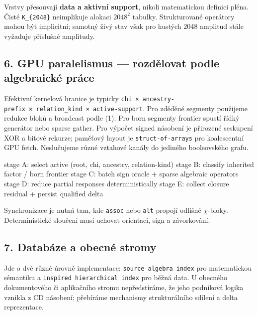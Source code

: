 \documentclass[
  10pt,
]{article}
\newenvironment{Shaded}{}{}
\newcommand{\NormalTok}[1]{#1}
\begin{document}
Vrstvy přesouvají \textbf{data a aktivní support}, nikoli matematickou
definici pléna. Čisté \texttt{K\_\{2048\}} neimplikuje alokaci
\(2048^2\) tabulky. Strukturované operátory mohou být implicitní;
samotný živý stav však pro hustých 2048 amplitud stále vyžaduje
příslušné amplitudy.

\subsection{6. GPU paralelismus --- rozdělovat podle algebraické
práce}\label{gpu-paralelismus-rozdux11blovat-podle-algebraickuxe9-pruxe1ce}

Efektivní kernelová hranice je typicky
\texttt{chi\ ×\ ancestry-prefix\ ×\ relation\_kind\ ×\ active-support}.
Pro zděděné segmenty použijeme redukce bloků a broadcast podle (1). Pro
born segmenty frontier spustí řídký generátor nebo sparse gather. Pro
výpočet signed násobení je přirozené seskupení XOR a bitové rekurze;
paměťový layout je \texttt{struct-of-arrays} pro koalescentní GPU fetch.
Neslučujeme různé vztahové kanály do jediného booleovského grafu.

\begin{Shaded}
\begin{Highlighting}[]
\NormalTok{stage A: select active (root, chi, ancestry, relation{-}kind)}
\NormalTok{stage B: classify inherited factor / born frontier}
\NormalTok{stage C: batch sign oracle + sparse algebraic operators}
\NormalTok{stage D: reduce partial responses deterministically}
\NormalTok{stage E: collect closure residual + persist qualified delta}
\end{Highlighting}
\end{Shaded}

Synchronizace je nutná tam, kde \texttt{assoc} nebo \texttt{alt} propojí
odlišné \(\chi\)-bloky. Deterministické sloučení musí uchovat orientaci,
sign a závorkování.

\subsection{7. Databáze a obecné
stromy}\label{databuxe1ze-a-obecnuxe9-stromy}

Jde o dvě různé úrovně implementace: \texttt{source\ algebra\ index} pro
matematickou sémantiku a \texttt{inspired\ hierarchical\ index} pro
běžná data. U obecného dokumentového či aplikačního stromu
nepředstíráme, že jeho podniková logika vznikla z CD násobení; přebíráme
mechanismy strukturálního sdílení a delta reprezentace.
\end{document}
